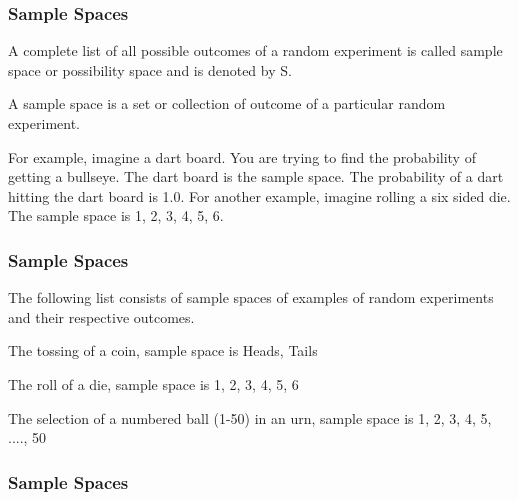 \begin{frame}
\frametitle{Sample Spaces}


A complete list of all possible outcomes of a random experiment is called sample space or possibility space and is denoted by S.


A sample space is a set or collection of outcome of a particular random experiment.


For example, imagine a dart board. You are trying to find the probability of getting a bullseye. The dart board is the sample space. The probability of a dart hitting the dart board is 1.0. For another example, imagine rolling a six sided die. The sample space is {1, 2, 3, 4, 5, 6}.

\end{frame}
\begin{frame}
\frametitle{Sample Spaces}

The following list consists of sample spaces of examples of random experiments and their respective outcomes.

The tossing of a coin, sample space is {Heads, Tails}

The roll of a die, sample space is {1, 2, 3, 4, 5, 6}

The selection of a numbered ball (1-50) in an urn, sample space is {1, 2, 3, 4, 5, ...., 50}

\end{frame}
\begin{frame}
\frametitle{Sample Spaces}

\end{frame}

